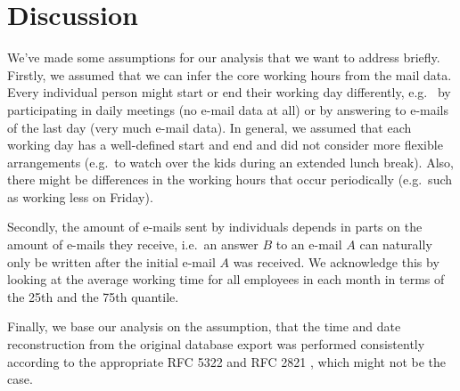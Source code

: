 \documentclass{article}
\begin{document}
\section{Discussion}
We've made some assumptions for our analysis that we want to address briefly.
Firstly, we assumed that we can infer the core working hours from the mail data.
Every individual person might start or end their working day differently, e.g.~
by participating in daily meetings (no e-mail data at all) or by answering to
e-mails of the last day (very much e-mail data). In general, we assumed that
each working day has a well-defined start and end and did not consider more
flexible arrangements (e.g.~to watch over the kids during an extended lunch
break). Also, there might be differences in the working hours that occur
periodically (e.g.~such as working less on Friday).

Secondly, the amount of e-mails sent by individuals depends in parts on the
amount of e-mails they receive, i.e.~an answer $B$ to an e-mail $A$ can naturally
only be written after the initial e-mail $A$ was received. We acknowledge this
by looking at the average working time for all employees in each month in terms
of the 25th and the 75th quantile.

Finally, we base our analysis on the assumption, that the time and date
reconstruction from the original database export was performed consistently
according to the appropriate RFC 5322 \citep{rfc5322} and RFC 2821
\citep{rfc2821}, which might not be the case.



\end{document}
